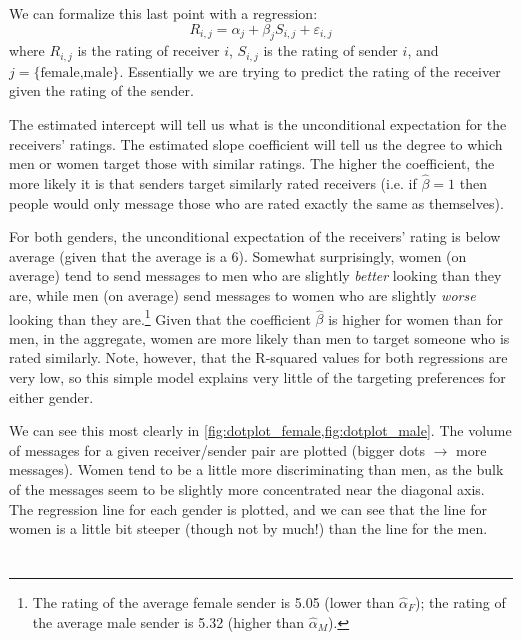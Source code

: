 We can formalize this last point with a regression:
\[ R_{i,j} = \alpha_j + \beta_j S_{i,j} + \varepsilon_{i,j} \]
where $R_{i,j}$ is the rating of receiver $i$, $S_{i,j}$ is the rating of sender $i$, and $j=\text{\{female,male\}}$. Essentially we are trying to predict the rating of the receiver given the rating of the sender.

The estimated intercept will tell us what is the unconditional expectation for the receivers' ratings. The estimated slope coefficient will tell us the degree to which men or women target those with similar ratings. The higher the coefficient, the more likely it is that senders target similarly rated receivers (i.e. if $\hat{\beta}=1$ then people would only message those who are rated exactly the same as themselves).



For both genders, the unconditional expectation of the receivers' rating is below average (given that the average is a 6). Somewhat surprisingly, women (on average) tend to send messages to men who are slightly \textit{better} looking than they are, while men (on average) send messages to women who are slightly \textit{worse} looking than they are.\footnote{The rating of the average female sender is 5.05 (lower than $\hat{\alpha}_{F}$); the rating of the average male sender is 5.32 (higher than $\hat{\alpha}_{M}$).} Given that the coefficient $\hat{\beta}$ is higher for women than for men, in the aggregate, women are more likely than men to target someone who is rated similarly. Note, however, that the R-squared values for both regressions are very low, so this simple model explains very little of the targeting preferences for either gender.

We can see this most clearly in \vref{fig:dotplot_female,fig:dotplot_male}. The volume of messages for a given receiver/sender pair are plotted (bigger dots $\rightarrow$ more messages). Women tend to be a little more discriminating than men, as the bulk of the messages seem to be slightly more concentrated near the diagonal axis. The regression line for each gender is plotted, and we can see that the line for women is a little bit steeper (though not by much!) than the line for the men.




\section{}


